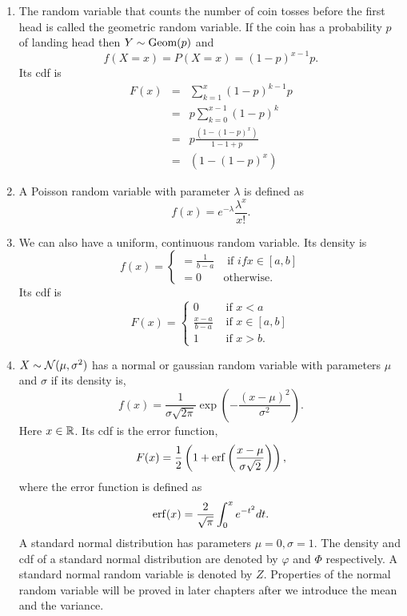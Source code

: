 \documentclass{article}
\begin{document}
\begin{enumerate}
\item The random variable that counts the number of coin tosses before the first
head is called the geometric random variable. If the coin has a probability $p$
of landing head then $Y \sim \text{Geom}(p)$ and
\begin{equation}\label{c2e6}
f(X=x) = P(X=x) = (1 - p)^{x-1}p.
\end{equation}
Its cdf is
\begin{eqnarray}
F(x) &=& \sum_{k=1}^x (1-p)^{k-1}p \nonumber \\
 &=& p\sum_{k=0}^{x-1}(1 - p)^k \nonumber \\
 &=& p\frac{(1 - (1 - p)^x)}{1 - 1 + p} \nonumber \\
 &=& (1 - (1 - p)^x) \label{c2e7}
\end{eqnarray}

\item A Poisson random variable with parameter $\lambda$ is defined as 
\begin{equation}\label{c2e8}
f(x) = e^{-\lambda}\frac{\lambda^x}{x!}.
\end{equation}

\item We can also have a uniform, continuous random variable. Its density is
\begin{equation}\label{c2e9}
f(x) = \begin{cases}
=\frac{1}{b - a} & \text{ if } if x \in [a, b] \\
= 0 & \text{otherwise}.
\end{cases}
\end{equation}
Its cdf is
\begin{equation}\label{c2e10}
F(x) = \begin{cases}
0 & \text{ if } x < a \\
\frac{x - a}{b - a} & \text{ if } x \in [a, b] \\
1 & \text{ if } x > b.
\end{cases}
\end{equation}

\item $X \sim \mathcal{N}(\mu, \sigma^2)$ has a normal or gaussian random variable with 
parameters $\mu$ and $\sigma$ if its density is,
\begin{equation}\label{c2e10}
f(x) = \frac{1}{\sigma\sqrt{2\pi}}\exp\left(-\frac{(x - \mu)^2}{\sigma^2}\right).
\end{equation}
Here $x \in \mathbb{R}$. Its cdf is the error function,
\begin{equation}\label{c2e11}
F(x) = \frac{1}{2}\left(1 + \operatorname{erf}\left(\frac{x - \mu}{\sigma\sqrt{2}}\right)\right),
\end{equation}
where the error function is defined as 
\begin{equation}\label{c2e12}
\operatorname{erf}(x) = \frac{2}{\sqrt{\pi}}\int_0^x e^{-t^2}dt.
\end{equation}
A standard normal distribution has parameters $\mu = 0, \sigma = 1$. The density 
and cdf of a standard normal distribution are denoted by $\varphi$ and $\Phi$ 
respectively. A standard normal random variable is denoted by $Z$. Properties of
the normal random variable will be proved in later chapters after we introduce the
mean and the variance.


\end{enumerate}
\end{document}
